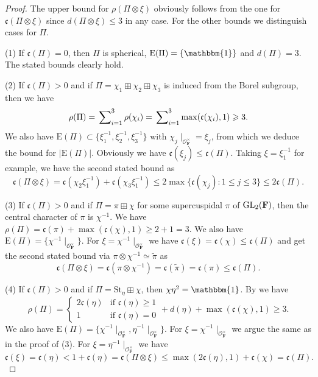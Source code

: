 \documentclass[A4]{amsart}
\def\leq{\leqslant}
\def\geq{\geqslant}
\numberwithin{equation}{section} \everymath{\displaystyle}
\newcommand{\GL}{{\rm GL}}
\newcommand{\id}{\mathbbm{1}}
\newcommand{\F}{\mathbf{F}}
\newcommand{\vO}{\mathcal{O}}
\newcommand{\extnorm}[1]{\left\lvert #1 \right\rvert}
\newcommand{\cond}{\mathfrak{c}}
\newcommand{\condL}{\mathfrak{\rho}}
\begin{document}
\begin{proof}
	The upper bound for $\condL(\Pi \otimes \xi)$ obviously follows from the one for $\cond(\Pi \otimes \xi)$ since $d(\Pi \otimes \xi) \leq 3$ in any case. For the other bounds we distinguish cases for $\Pi$.

\noindent (1) If $\cond(\Pi)=0$, then $\Pi$ is spherical, $\mathrm{E}(\Pi)=\{ \id \}$ and $d(\Pi)=3$. The stated bounds clearly hold.

\noindent (2) If $\cond(\Pi) > 0$ and if $\Pi = \chi_1 \boxplus \chi_2 \boxplus \chi_3$ is induced from the Borel subgroup, then we have
	$$ \condL(\Pi) = \sideset{}{_{i=1}^3} \sum \condL(\chi_i) = \sideset{}{_{i=1}^3} \sum \max(\cond(\chi_i),1) \geq 3. $$
 	We also have $\mathrm{E}(\Pi) \subset \{ \xi_1^{-1}, \xi_2^{-1}, \xi_3^{-1} \}$ with $\chi_j \mid_{\vO_{\F}^{\times}} = \xi_j$, from which we deduce the bound for $\extnorm{\mathrm{E}(\Pi)}$. Obviously we have $\cond(\xi_j) \leq \cond(\Pi)$. Taking $\xi = \xi_1^{-1}$ for example, we have the second stated bound as
	$$ \cond(\Pi \otimes \xi) = \cond(\chi_2\xi_1^{-1}) + \cond(\chi_3\xi_1^{-1}) \leq 2 \max \{ \cond(\chi_j): 1 \leq j \leq 3 \} \leq 2 \cond(\Pi). $$
	
\noindent (3) If $\cond(\Pi) > 0$ and if $\Pi = \pi \boxplus \chi$ for some supercuspidal $\pi$ of $\GL_2(\F)$, then the central character of $\pi$ is $\chi^{-1}$. We have $\condL(\Pi) = \cond(\pi)+\max(\cond(\chi),1) \geq 2+1= 3$. We also have $\mathrm{E}(\Pi) = \{ \chi^{-1} \mid_{\vO_{\F}^{\times}} \}$. For $\xi = \chi^{-1} \mid_{\vO_{\F}^{\times}}$ we have $\cond(\xi) = \cond(\chi) \leq \cond(\Pi)$ and get the second stated bound via $\pi \otimes \chi^{-1} \simeq \widetilde{\pi}$ as
	$$ \cond(\Pi \otimes \xi) = \cond(\pi \otimes \chi^{-1}) = \cond(\widetilde{\pi}) = \cond(\pi) \leq \cond(\Pi). $$
	
\noindent (4) If $\cond(\Pi) > 0$ and if $\Pi = \mathrm{St}_{\eta} \boxplus \chi$, then $\chi \eta^2 = \id$. By \cite[\S 8 Proposition \& \S 10 Proposition]{Ro94} we have
	$$ \condL(\Pi) = 
	\begin{cases}
		2 \cond(\eta) & \text{if } \cond(\eta) \geq 1 \\
		1 & \text{if } \cond(\eta)=0
	\end{cases}
	+ d(\eta) + \max(\cond(\chi),1) \geq 3. $$
 	We also have $\mathrm{E}(\Pi) = \{ \chi^{-1} \mid_{\vO_{\F}^{\times}}, \eta^{-1} \mid_{\vO_{\F}^{\times}} \}$. For $\xi = \chi^{-1} \mid_{\vO_{\F}^{\times}}$ we argue the same as in the proof of (3). For $\xi = \eta^{-1} \mid_{\vO_{\F}^{\times}}$ we have
	$$ \cond(\xi) = \cond(\eta) < 1+\cond(\eta) = \cond(\Pi \otimes \xi) \leq \max(2\cond(\eta),1) + \cond(\chi) = \cond(\Pi). $$
	

\end{proof}
\end{document}
